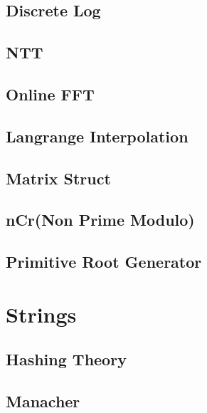 \subsection{Discrete Log}
\raggedbottom
\hrulefill
\subsection{NTT}
\raggedbottom
\hrulefill
\subsection{Online FFT}
\raggedbottom
\hrulefill
\subsection{Langrange Interpolation}
\raggedbottom
\hrulefill
\subsection{Matrix Struct}
\raggedbottom
\hrulefill
\subsection{nCr(Non Prime Modulo)}
\raggedbottom
\hrulefill
\subsection{Primitive Root Generator}
\raggedbottom
\hrulefill

\section{Strings}
\subsection{Hashing Theory}
\raggedbottom
\hrulefill
\subsection{Manacher}
\raggedbottom
\hrulefill
